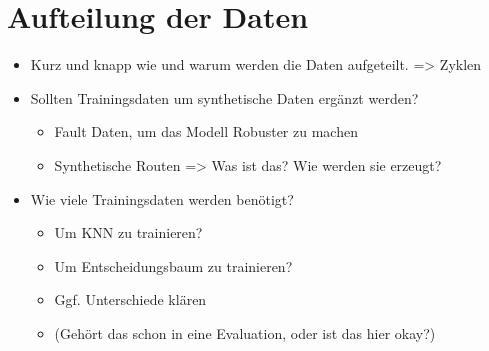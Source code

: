 \section{Aufteilung der Daten}
\begin{itemize}
    \item Kurz und knapp wie und warum werden die Daten aufgeteilt. => Zyklen
    \item Sollten Trainingsdaten um synthetische Daten ergänzt werden?
    \begin{itemize}
        \item Fault Daten, um das Modell Robuster zu machen
        \item Synthetische Routen => Was ist das? Wie werden sie erzeugt?
    \end{itemize}
    \item Wie viele Trainingsdaten werden benötigt?
    \begin{itemize}
        \item Um KNN zu trainieren?
        \item Um Entscheidungsbaum zu trainieren?
        \item Ggf. Unterschiede klären
        \item (Gehört das schon in eine Evaluation, oder ist das hier okay?)
    \end{itemize}
\end{itemize}